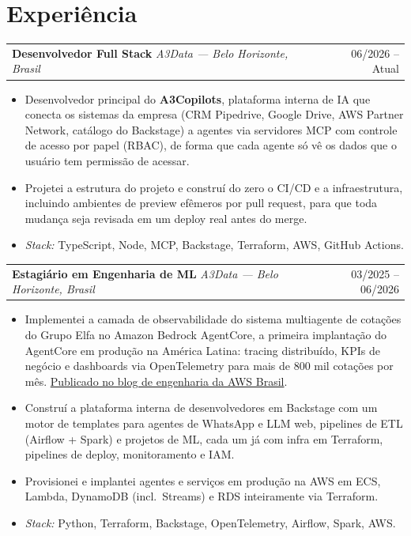\documentclass[10pt,a4paper]{article}
\makeatletter
\newcommand{\role}[4]{%
  \par\vspace{1pt}%
  \noindent\begin{tabular*}{\linewidth}[t]{@{}l@{\extracolsep{\fill}}r@{}}
    \textbf{#1} \textit{\textcolor{muted}{#2}} & \textcolor{muted}{#3} \\
  \end{tabular*}\par\nobreak
  \vspace{1pt}#4\par
}
\makeatother
\begin{document}
\section*{Experiência}
\role{Desenvolvedor Full Stack}{A3Data --- Belo Horizonte, Brasil}{06/2026 -- Atual}{
  \begin{itemize}
    \item Desenvolvedor principal do \textbf{A3Copilots}, plataforma interna de IA
          que conecta os sistemas da empresa (CRM Pipedrive, Google Drive, AWS
          Partner Network, catálogo do Backstage) a agentes via servidores MCP
          com controle de acesso por papel (RBAC), de forma que cada agente só
          vê os dados que o usuário tem permissão de acessar.
    \item Projetei a estrutura do projeto e construí do zero o CI/CD e a
          infraestrutura, incluindo ambientes de preview efêmeros por pull
          request, para que toda mudança seja revisada em um deploy real antes
          do merge.
    \item \textit{Stack:} TypeScript, Node, MCP, Backstage, Terraform, AWS, GitHub Actions.
  \end{itemize}
}
\role{Estagiário em Engenharia de ML}{A3Data --- Belo Horizonte, Brasil}{03/2025 -- 06/2026}{
  \begin{itemize}
    \item Implementei a camada de observabilidade do sistema multiagente de
          cotações do Grupo Elfa no Amazon Bedrock AgentCore, a primeira
          implantação do AgentCore em produção na América Latina: tracing
          distribuído, KPIs de negócio e dashboards via OpenTelemetry para mais
          de 800 mil cotações por mês.
          \href{https://aws.amazon.com/pt/blogs/aws-brasil/grupo-elfa-aplicando-amazon-bedrock-agentcore-para-observabilidade-de-sistema-multiagente-em-escala/}{Publicado no blog de engenharia da AWS Brasil}.
    \item Construí a plataforma interna de desenvolvedores em Backstage com um
          motor de templates para agentes de WhatsApp e LLM web, pipelines de
          ETL (Airflow + Spark) e projetos de ML, cada um já com infra em
          Terraform, pipelines de deploy, monitoramento e IAM.
    \item Provisionei e implantei agentes e serviços em produção na AWS em ECS,
          Lambda, DynamoDB (incl.\ Streams) e RDS inteiramente via Terraform.
    \item \textit{Stack:} Python, Terraform, Backstage, OpenTelemetry, Airflow, Spark, AWS.
  \end{itemize}
}
\end{document}

